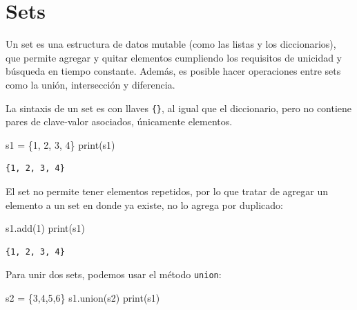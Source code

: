\documentclass[
  letterpaper,
  DIV=11,
  numbers=noendperiod]{scrreprt}
\newenvironment{Shaded}{\begin{snugshade}}{\end{snugshade}}
\newcommand{\BuiltInTok}[1]{\textcolor[rgb]{0.00,0.23,0.31}{#1}}
\newcommand{\DecValTok}[1]{\textcolor[rgb]{0.68,0.00,0.00}{#1}}
\newcommand{\NormalTok}[1]{\textcolor[rgb]{0.00,0.23,0.31}{#1}}
\newcommand{\OperatorTok}[1]{\textcolor[rgb]{0.37,0.37,0.37}{#1}}
\begin{document}
\section{Sets}\label{sets}

Un set es una estructura de datos mutable (como las listas y los
diccionarios), que permite agregar y quitar elementos cumpliendo los
requisitos de unicidad y búsqueda en tiempo constante. Además, es
posible hacer operaciones entre sets como la unión, intersección y
diferencia.

La sintaxis de un set es con llaves \texttt{\{\}}, al igual que el
diccionario, pero no contiene pares de clave-valor asociados, únicamente
elementos.

\begin{Shaded}
\begin{Highlighting}[]
\NormalTok{s1 }\OperatorTok{=}\NormalTok{ \{}\DecValTok{1}\NormalTok{, }\DecValTok{2}\NormalTok{, }\DecValTok{3}\NormalTok{, }\DecValTok{4}\NormalTok{\}}
\BuiltInTok{print}\NormalTok{(s1)}
\end{Highlighting}
\end{Shaded}

\begin{verbatim}
{1, 2, 3, 4}
\end{verbatim}

El set no permite tener elementos repetidos, por lo que tratar de
agregar un elemento a un set en donde ya existe, no lo agrega por
duplicado:

\begin{Shaded}
\begin{Highlighting}[]
\NormalTok{s1.add(}\DecValTok{1}\NormalTok{)}
\BuiltInTok{print}\NormalTok{(s1)}
\end{Highlighting}
\end{Shaded}

\begin{verbatim}
{1, 2, 3, 4}
\end{verbatim}

Para unir dos sets, podemos usar el método \texttt{union}:

\begin{Shaded}
\begin{Highlighting}[]
\NormalTok{s2 }\OperatorTok{=}\NormalTok{ \{}\DecValTok{3}\NormalTok{,}\DecValTok{4}\NormalTok{,}\DecValTok{5}\NormalTok{,}\DecValTok{6}\NormalTok{\}}
\NormalTok{s1.union(s2)}
\BuiltInTok{print}\NormalTok{(s1)}
\end{Highlighting}
\end{Shaded}
\end{document}
